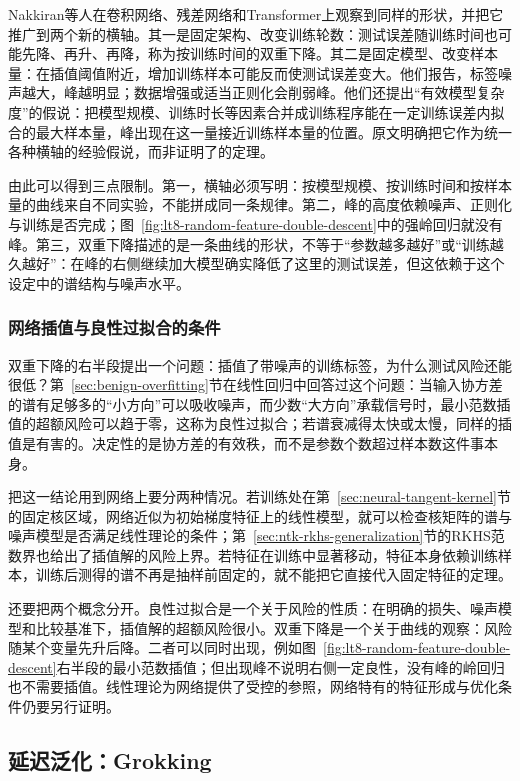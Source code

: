 Nakkiran等人在卷积网络、残差网络和Transformer上观察到同样的形状，并把它推广到两个新的横轴。其一是固定架构、改变训练轮数：测试误差随训练时间也可能先降、再升、再降，称为按训练时间的双重下降。其二是固定模型、改变样本量：在插值阈值附近，增加训练样本可能反而使测试误差变大。他们报告，标签噪声越大，峰越明显；数据增强或适当正则化会削弱峰。他们还提出“有效模型复杂度”的假说：把模型规模、训练时长等因素合并成训练程序能在一定训练误差内拟合的最大样本量，峰出现在这一量接近训练样本量的位置。原文明确把它作为统一各种横轴的经验假说，而非证明了的定理。

由此可以得到三点限制。第一，横轴必须写明：按模型规模、按训练时间和按样本量的曲线来自不同实验，不能拼成同一条规律。第二，峰的高度依赖噪声、正则化与训练是否完成；图~\ref{fig:lt8-random-feature-double-descent}中的强岭回归就没有峰。第三，双重下降描述的是一条曲线的形状，不等于“参数越多越好”或“训练越久越好”：在峰的右侧继续加大模型确实降低了这里的测试误差，但这依赖于这个设定中的谱结构与噪声水平。

\subsubsection{网络插值与良性过拟合的条件}

双重下降的右半段提出一个问题：插值了带噪声的训练标签，为什么测试风险还能很低？第~\ref{sec:benign-overfitting}节在线性回归中回答过这个问题：当输入协方差的谱有足够多的“小方向”可以吸收噪声，而少数“大方向”承载信号时，最小范数插值的超额风险可以趋于零，这称为良性过拟合；若谱衰减得太快或太慢，同样的插值是有害的。决定性的是协方差的有效秩，而不是参数个数超过样本数这件事本身。

把这一结论用到网络上要分两种情况。若训练处在第~\ref{sec:neural-tangent-kernel}节的固定核区域，网络近似为初始梯度特征上的线性模型，就可以检查核矩阵的谱与噪声模型是否满足线性理论的条件；第~\ref{sec:ntk-rkhs-generalization}节的RKHS范数界也给出了插值解的风险上界。若特征在训练中显著移动，特征本身依赖训练样本，训练后测得的谱不再是抽样前固定的，就不能把它直接代入固定特征的定理。

还要把两个概念分开。良性过拟合是一个关于风险的性质：在明确的损失、噪声模型和比较基准下，插值解的超额风险很小。双重下降是一个关于曲线的观察：风险随某个变量先升后降。二者可以同时出现，例如图~\ref{fig:lt8-random-feature-double-descent}右半段的最小范数插值；但出现峰不说明右侧一定良性，没有峰的岭回归也不需要插值。线性理论为网络提供了受控的参照，网络特有的特征形成与优化条件仍要另行证明。

\subsection{延迟泛化：Grokking}
\label{sec:grokking}

